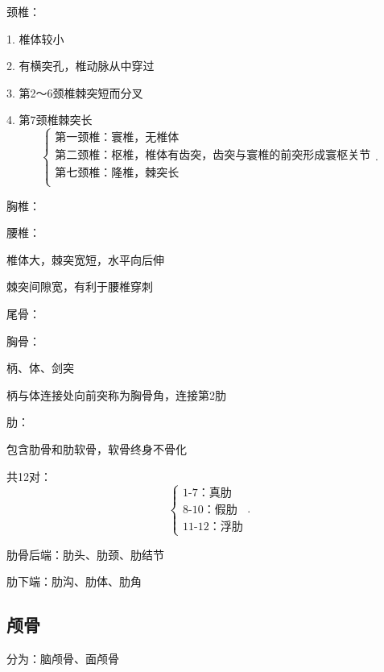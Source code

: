 \begin{notation}
    颈椎：

    1. 椎体较小
    
    2. 有横突孔，椎动脉从中穿过

    3. 第2～6颈椎棘突短而分叉

    4. 第7颈椎棘突长
    \[
        \begin{cases}
            \text{第一颈椎：寰椎，无椎体}\\ 
            \text{第二颈椎：枢椎，椎体有齿突，齿突与寰椎的前突形成寰枢关节}\\ 
            \text{第七颈椎：隆椎，棘突长}\\ 
        \end{cases}
    .\] 
\end{notation}

\begin{notation}
    胸椎：
\end{notation}

\begin{notation}
    腰椎：

    椎体大，棘突宽短，水平向后伸

    棘突间隙宽，有利于腰椎穿刺
\end{notation}

\begin{notation}
    尾骨：
\end{notation}

\begin{notation}
    胸骨：

    柄、体、剑突

    柄与体连接处向前突称为胸骨角，连接第2肋
\end{notation}

\begin{notation}
    肋：

    包含肋骨和肋软骨，软骨终身不骨化

    共12对：
    \[
        \begin{cases}
            \text{1-7：真肋}\\ 
            \text{8-10：假肋}\\ 
            \text{11-12：浮肋}
        \end{cases}
    .\] 

    肋骨后端：肋头、肋颈、肋结节

    肋下端：肋沟、肋体、肋角
\end{notation}

\subsection{颅骨}%
\label{sub:颅骨}
分为：脑颅骨、面颅骨

